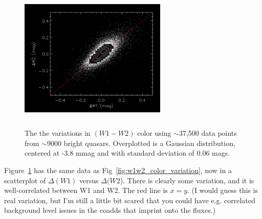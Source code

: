 \documentclass{emulateapj}
\begin{document}
    \begin{figure}
      \includegraphics[width=7.00cm, height=7.00cm, 
      trim=0.0cm 0.0cm 0.0cm 0.0cm, clip]
      {scatter_dW1_dW2.png}
      \centering
      \caption[]{The the variations in $(W1-W2)$ color using
        $\sim$37,500 data points from $\sim$9000 bright quasars. Overplotted
        is a Gaussian distribution, centered at -3.8 mmag and with standard
        deviation of 0.06 mags.}
      \label{fig:scatter_dW1_dW2}
    \end{figure}
    Figure~\ref{fig:scatter_dW1_dW2} has the same data as
    Fig~\ref{fig:w1w2_color_variation}, now in a scatterplot of
    $\Delta(W1)$ versus $\Delta(W2$). There is clearly some variation, and
    it is well-correlated between W1 and W2. The red line is $x=y$. 
    (I would guess this is real variation, but I'm still a little bit scared that
    you could have e.g. correlated background level issues in the coadds
    that imprint onto the fluxes.)
\end{document}
